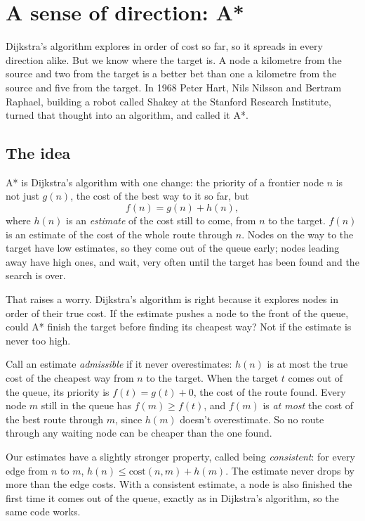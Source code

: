 \chapter{A sense of direction: A*}\label{ch:astar}

Dijkstra's algorithm explores in order of cost so far, so it spreads in
every direction alike. But we know where the target is. A node a kilometre
from the source and two from the target is a better bet than one a
kilometre from the source and five from the target. In 1968 Peter Hart,
Nils Nilsson and Bertram Raphael, building a robot called Shakey at the
Stanford Research Institute, turned that thought into an algorithm, and
called it A*.

\section{The idea}

A* is Dijkstra's algorithm with one change: the priority of a frontier
node $n$ is not just $g(n)$, the cost of the best way to it so far, but
\[
  f(n) = g(n) + h(n),
\]
where $h(n)$ is an \emph{estimate} of the cost still to come, from $n$ to
the target. $f(n)$ is an estimate of the cost of the whole route through
$n$. Nodes on the way to the target have low estimates, so they come out of
the queue early; nodes leading away have high ones, and wait, very often
until the target has been found and the search is over.

That raises a worry. Dijkstra's algorithm is right because it explores
nodes in order of their true cost. If the estimate pushes a node to the
front of the queue, could A* finish the target before finding its cheapest
way? Not if the estimate is never too high.

\begin{mathbox}
Call an estimate \emph{admissible} if it never overestimates:
$h(n)$ is at most the true cost of the cheapest way from $n$ to the
target. When the target $t$ comes out of the queue, its priority is
$f(t) = g(t) + 0$, the cost of the route found. Every node $m$ still in the
queue has $f(m) \ge f(t)$, and $f(m)$ is \emph{at most} the cost of the
best route through $m$, since $h(m)$ doesn't overestimate. So no route
through any waiting node can be cheaper than the one found.

Our estimates have a slightly stronger property, called being
\emph{consistent}: for every edge from $n$ to $m$, $h(n) \le
\text{cost}(n, m) + h(m)$. The estimate never drops by more than the edge
costs. With a consistent estimate, a node is also finished the first time
it comes out of the queue, exactly as in Dijkstra's algorithm, so the same
code works.
\end{mathbox}

